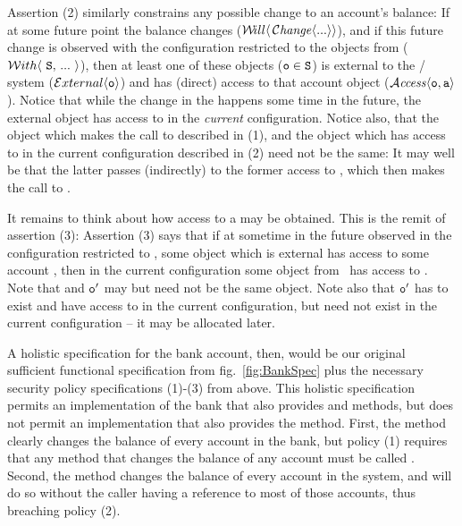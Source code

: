 Assertion (2) similarly constrains any possible change to an 
account's balance: 
If at some future point the balance changes  (${\Future{\,\Changes{...}}}$),  %
and if this future change is observed with the configuration restricted to the objects from \SF 
  (\ie $\Using{...}{\prg{S}}$), then 
at least one of these objects ($\prg{o}\in\SF$) is external to the / system ($\External{\prg{o}}$) and 
has (direct) access to that account object
($\CanAccess{\prg{o}}{\prg{a}}$).
Notice that while the change in the  happens some time in the future,
the external object  has access to  in the \emph{current} configuration.
Notice also, that the object which makes the call to  described in (1), and the object which 
has access to  in the current configuration described in (2) need not be the same: It may well be that the
latter passes (indirectly) to the former access to , which then   makes the call
to .

It remains to think about how access to a  may be obtained. This is the remit of assertion (3): 
Assertion (3) says that if at sometime in the future observed in the configuration restricted to \SF, 
some object  which is external has access to some account , then in the current configuration some object 
from \SF~has access to . Note that  and $\prg{o}'$ may but need not be the same object. Note also
that $\prg{o}'$ has to exist and have access to  in the current configuration, but 
 need not exist in the current configuration -- it may be allocated later.

\vspace{.1cm}

A  holistic  specification for the bank account, then,
would be our original sufficient functional specification from
fig.~\ref{fig:BankSpec} plus the necessary security policy
specifications (1)-(3) from above. %
This holistic specification
permits an implementation of the bank that also provides  
and  methods,  but does not permit an
implementation that also provides the  method.
First, the  method clearly changes the balance of
every account in the bank, but policy (1) requires that any method
that changes the balance of any account must be called .
Second, the  method changes the balance of every account in
the system, and will do so without the caller having a reference to
most of those accounts, thus breaching policy (2).   
 

